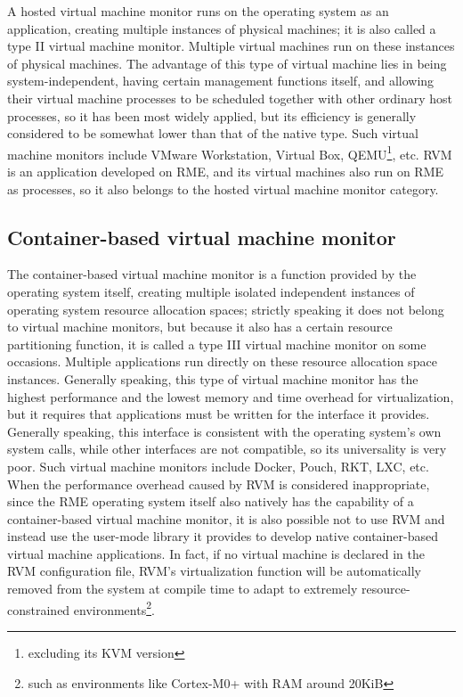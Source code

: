 A hosted virtual machine monitor runs on the operating system as an application, creating multiple instances of physical machines; it is also called a type II virtual machine monitor. Multiple virtual machines run on these instances of physical machines. The advantage of this type of virtual machine lies in being system-independent, having certain management functions itself, and allowing their virtual machine processes to be scheduled together with other ordinary host processes, so it has been most widely applied, but its efficiency is generally considered to be somewhat lower than that of the native type. Such virtual machine monitors include VMware Workstation, Virtual Box, QEMU\footnote{excluding its KVM version}, etc. RVM is an application developed on RME, and its virtual machines also run on RME as processes, so it also belongs to the hosted virtual machine monitor category.

\subsection{Container-based virtual machine monitor}\label{subsec:1-2-3}

The container-based virtual machine monitor is a function provided by the operating system itself, creating multiple isolated independent instances of operating system resource allocation spaces; strictly speaking it does not belong to virtual machine monitors, but because it also has a certain resource partitioning function, it is called a type III virtual machine monitor on some occasions. Multiple applications run directly on these resource allocation space instances. Generally speaking, this type of virtual machine monitor has the highest performance and the lowest memory and time overhead for virtualization, but it requires that applications must be written for the interface it provides. Generally speaking, this interface is consistent with the operating system's own system calls, while other interfaces are not compatible, so its universality is very poor. Such virtual machine monitors include Docker, Pouch, RKT, LXC, etc. When the performance overhead caused by RVM is considered inappropriate, since the RME operating system itself also natively has the capability of a container-based virtual machine monitor, it is also possible not to use RVM and instead use the user-mode library it provides to develop native container-based virtual machine applications. In fact, if no virtual machine is declared in the RVM configuration file, RVM's virtualization function will be automatically removed from the system at compile time to adapt to extremely resource-constrained environments\footnote{such as environments like Cortex-M0+ with RAM around 20KiB}.

